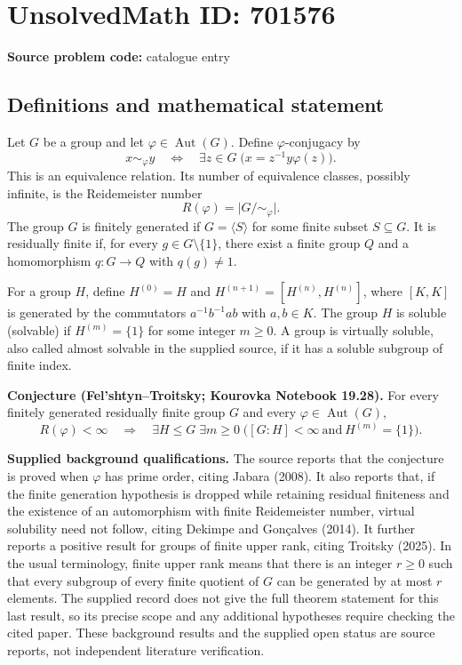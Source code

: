 \documentclass[11pt]{article}
\begin{document}
\section*{UnsolvedMath ID: 701576}
\textbf{Source problem code:} catalogue entry
\subsection{Definitions and mathematical statement}
Let \(G\) be a group and let \(\varphi\in\operatorname{Aut}(G)\). Define \(\varphi\)-conjugacy by
\[
x\sim_\varphi y\quad\Longleftrightarrow\quad \exists z\in G\;\bigl(x=z^{-1}y\varphi(z)\bigr).
\]
This is an equivalence relation. Its number of equivalence classes, possibly infinite, is the Reidemeister number
\[
R(\varphi)=\lvert G/{\sim_\varphi}\rvert.
\]
The group \(G\) is finitely generated if \(G=\langle S\rangle\) for some finite subset \(S\subseteq G\). It is residually finite if, for every \(g\in G\setminus\{1\}\), there exist a finite group \(Q\) and a homomorphism \(q:G\to Q\) with \(q(g)\ne1\).

For a group \(H\), define \(H^{(0)}=H\) and \(H^{(n+1)}=[H^{(n)},H^{(n)}]\), where \([K,K]\) is generated by the commutators \(a^{-1}b^{-1}ab\) with \(a,b\in K\). The group \(H\) is soluble (solvable) if \(H^{(m)}=\{1\}\) for some integer \(m\ge0\). A group is virtually soluble, also called almost solvable in the supplied source, if it has a soluble subgroup of finite index.

\textbf{Conjecture (Fel'shtyn--Troitsky; Kourovka Notebook 19.28).} For every finitely generated residually finite group \(G\) and every \(\varphi\in\operatorname{Aut}(G)\),
\[
R(\varphi)<\infty
\quad\Longrightarrow\quad
\exists H\le G\;\exists m\ge0\;\bigl([G:H]<\infty\ \text{and}\ H^{(m)}=\{1\}\bigr).
\]

\textbf{Supplied background qualifications.} The source reports that the conjecture is proved when \(\varphi\) has prime order, citing Jabara (2008). It also reports that, if the finite generation hypothesis is dropped while retaining residual finiteness and the existence of an automorphism with finite Reidemeister number, virtual solubility need not follow, citing Dekimpe and Gonçalves (2014). It further reports a positive result for groups of finite upper rank, citing Troitsky (2025). In the usual terminology, finite upper rank means that there is an integer \(r\ge0\) such that every subgroup of every finite quotient of \(G\) can be generated by at most \(r\) elements. The supplied record does not give the full theorem statement for this last result, so its precise scope and any additional hypotheses require checking the cited paper. These background results and the supplied open status are source reports, not independent literature verification.
\end{document}
